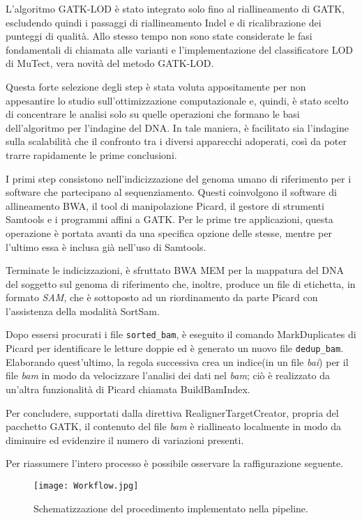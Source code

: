 L'algoritmo GATK-LOD è stato integrato solo fino al riallineamento di GATK, escludendo quindi i passaggi di riallineamento Indel e di ricalibrazione dei punteggi di qualità.
Allo stesso tempo non sono state considerate le fasi fondamentali di chiamata alle varianti e l'implementazione del classificatore LOD di MuTect, vera novità del metodo GATK-LOD.

Questa forte selezione degli step è stata voluta appositamente per non appesantire lo studio sull'ottimizzazione computazionale e, quindi, è stato scelto di concentrare le analisi solo su quelle operazioni che formano le basi dell'algoritmo per l'indagine del DNA.
In tale maniera, è facilitato sia l'indagine sulla scalabilità che il confronto tra i diversi apparecchi adoperati, così da poter trarre rapidamente le prime conclusioni.

I primi step consistono nell'indicizzazione del genoma umano di riferimento per i software che partecipano al sequenziamento.
Questi coinvolgono il software di allineamento BWA, il tool di manipolazione Picard, il gestore di strumenti Samtools e i programmi affini a GATK.
Per le prime tre  applicazioni, questa operazione è portata avanti da una specifica opzione delle stesse, mentre per l'ultimo essa è inclusa già nell'uso di Samtools.

Terminate le indicizzazioni, è sfruttato BWA MEM per la mappatura del DNA del soggetto sul genoma di riferimento che, inoltre, produce un file di etichetta, in formato \textit{SAM}, che è sottoposto ad un riordinamento da parte Picard con l'assistenza della modalità SortSam.

Dopo essersi procurati i file \verb!sorted_bam!, è eseguito il comando MarkDuplicates di Picard per identificare le letture doppie ed è generato un nuovo file \verb!dedup_bam!.
Elaborando quest'ultimo, la regola successiva crea un indice(in un file \textit{bai}) per il file \textit{bam} in modo da velocizzare l'analisi dei dati nel \textit{bam}; ciò è realizzato da un'altra funzionalità di Picard chiamata BuildBamIndex.

Per concludere, supportati dalla direttiva RealignerTargetCreator, propria del pacchetto GATK, il contenuto del file \textit{bam} è riallineato localmente in modo da diminuire ed evidenzire il numero di variazioni presenti.

Per riassumere l'intero processo è possibile osservare la raffigurazione seguente.
\begin{figure}[H]
\centering
\texttt{[image: Workflow.jpg]}
\caption{Schematizzazione del procedimento implementato nella pipeline.}
\label{fig:workflow}
\end{figure}




